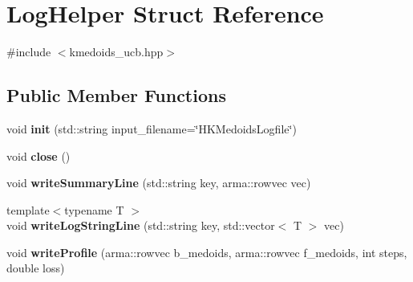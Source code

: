 \hypertarget{structLogHelper}{}\section{Log\+Helper Struct Reference}
\label{structLogHelper}


{\ttfamily \#include $<$kmedoids\+\_\+ucb.\+hpp$>$}

\subsection*{Public Member Functions}
\begin{DoxyCompactItemize}
\item 
\mbox{\label{structLogHelper_a0cbf766b210cc27f71bf309b42922ac8}} 
void {\bfseries init} (std\+::string input\+\_\+filename=\char`\"{}H\+K\+Medoids\+Logfile\char`\"{})
\item 
\mbox{\label{structLogHelper_a4624149f53c4577d0565f761c155d800}} 
void {\bfseries close} ()
\item 
\mbox{\label{structLogHelper_a5b1a8ff2ae2ce6e3293e3b34085e3b86}} 
void {\bfseries write\+Summary\+Line} (std\+::string key, arma\+::rowvec vec)
\item 
\mbox{\label{structLogHelper_ad1bb80fa2bd8b1dfcd944ea19c4e8e06}} 
{\footnotesize template$<$typename T $>$ }\\void {\bfseries write\+Log\+String\+Line} (std\+::string key, std\+::vector$<$ T $>$ vec)
\item 
\mbox{\label{structLogHelper_a15b3f49bf98956a0585f036801e25dbe}} 
void {\bfseries write\+Profile} (arma\+::rowvec b\+\_\+medoids, arma\+::rowvec f\+\_\+medoids, int steps, double loss)
\end{DoxyCompactItemize}
